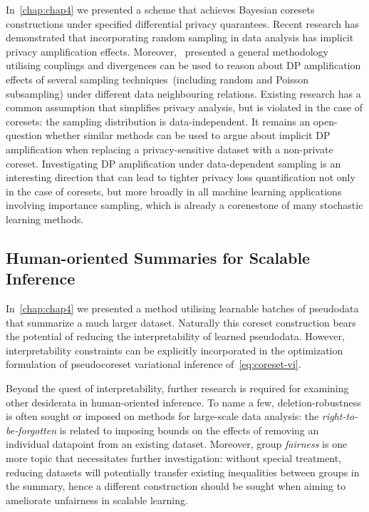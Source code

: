 In~\cref{chap:chap4} we presented a scheme that achieves  Bayesian coresets constructions under specified differential privacy quarantees. Recent research has demonstrated that incorporating random sampling in data analysis has implicit privacy amplification effects. Moreover,~\citep{balle18} presented a general methodology utilising couplings and divergences can be used to reason about DP amplification effects of several sampling techniques~(including random and Poisson subsampling) under different data neighbouring relations. Existing research has a common assumption that simplifies privacy analysis, but is violated in the case of coresets: the sampling distribution is data-independent. It remains an open-question whether similar methods can be used to argue about implicit DP amplification when replacing a privacy-sensitive dataset with a non-private coreset. Investigating DP amplification under data-dependent sampling is an interesting direction that can lead to tighter privacy loss quantification not only in the case of coresets, but more broadly in all machine learning applications involving importance sampling, which is already a corenestone of many stochastic learning methods. 


\subsection{Human-oriented Summaries for Scalable Inference}
\label{subsec:human-oriented-pseudodata}

In~\cref{chap:chap4} we presented a method utilising learnable batches of pseudodata that summarize a much larger dataset. Naturally this coreset construction bears the potential of reducing the interpretability of learned pseudodata. However, interpretability constraints can be explicitly incorporated in the optimization formulation of pseudocoreset variational inference of~\cref{eq:coreset-vi}.

Beyond the quest of interpretability, further research is required for examining other desiderata in human-oriented inference. To name a few, deletion-robustness is often sought or imposed on methods for large-scale data analysis: the \emph{right-to-be-forgotten} is related to imposing bounds on  the effects of removing an individual datapoint from an existing dataset. Moreover, group \emph{fairness} is one more topic that necessitates further investigation: without special treatment, reducing datasets will potentially transfer existing inequalities between groups in the summary, hence a different construction should be sought when aiming to ameliorate unfairness in scalable learning.  